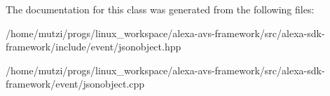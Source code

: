 The documentation for this class was generated from the following files\+:\begin{DoxyCompactItemize}
\item 
/home/mutzi/progs/linux\+\_\+workspace/alexa-\/avs-\/framework/src/alexa-\/sdk-\/framework/include/event/jsonobject.\+hpp\item 
/home/mutzi/progs/linux\+\_\+workspace/alexa-\/avs-\/framework/src/alexa-\/sdk-\/framework/event/jsonobject.\+cpp\end{DoxyCompactItemize}
